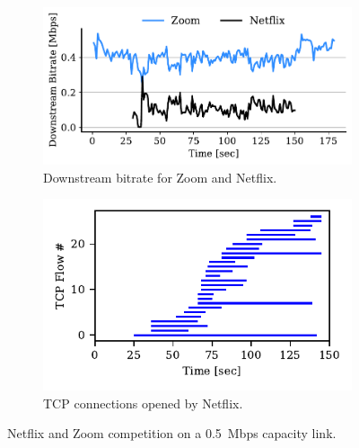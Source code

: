 \begin{figure}[t!]
\centering
\begin{subfigure}[t]{.45\textwidth}
    \centering
    \includegraphics[width=1\textwidth]{figures/comp_ts/zoom_netflix_0.5_dl_r1.pdf}
    \caption{Downstream bitrate for Zoom and Netflix.}
    \label{subfig:comp_zoom_netflix_bitrate}
\end{subfigure}\hfill
\begin{subfigure}[t]{.45\textwidth}
    \centering
    \includegraphics[width=1\textwidth]{figures/comp/netflix_connection_0_5.pdf}
    \caption{TCP connections opened by Netflix.}
    \label{subfig:comp_netflix_conn}
\end{subfigure}
\caption{Netflix and Zoom competition on a 0.5~Mbps capacity link.}
\label{fig:comp_netflix_zoom}
\end{figure}

